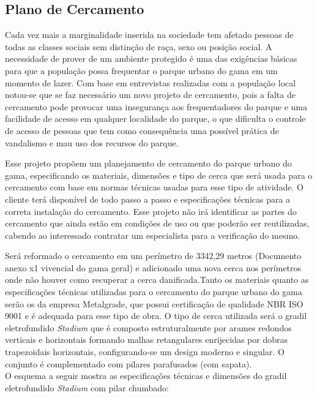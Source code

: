 \subsection{Plano de Cercamento}

Cada vez mais a marginalidade inserida na sociedade tem afetado pessoas de todas as classes sociais sem distin\c{c}\~ao de ra\c{c}a, sexo ou posi\c{c}\~ao social. A necessidade de prover de um ambiente protegido \'e uma das exig\^encias b\'asicas para que a popula\c{c}\~ao possa frequentar o parque urbano do gama em um momento de lazer. Com base em entrevistas realizadas com a popula\c{c}\~ao local notou-se que se faz necess\'ario um novo projeto de cercamento, pois a falta de cercamento pode provocar uma inseguran\c{c}a aos frequentadores do parque e uma facilidade de acesso em qualquer localidade do parque, o que dificulta o controle de acesso de pessoas que tem como consequ\^encia uma poss\'ivel pr\'atica de vandalismo e mau uso dos recursos do parque.

	Esse projeto prop\~oem um planejamento de cercamento do parque urbano do gama, especificando os materiais, dimens\~oes e tipo de cerca que ser\'a usada para o cercamento com base em normas t\'ecnicas usadas para esse tipo de atividade. O cliente ter\'a dispon\'ivel de todo passo a passo e especifica\c{c}\~oes t\'ecnicas para a correta instala\c{c}\~ao do cercamento. Esse projeto n\~ao ir\'a identificar as partes do cercamento que ainda est\~ao em condi\c{c}\~oes de uso ou que poder\~ao ser reutilizadas, cabendo ao interessado contratar um especialista para a verifica\c{c}\~ao do mesmo.
	
	Ser\'a reformado o cercamento em um per\'imetro de 3342,29 metros (Documento anexo x1 vivencial do gama geral) e adicionado uma nova cerca nos per\'imetros onde n\~ao houver como recuperar a cerca danificada.Tanto os materiais quanto as especifica\c{c}\~oes t\'ecnicas utilizadas para o cercamento do parque urbano do gama ser\~ao os da empresa Metalgrade, que possui certifica\c{c}\~ao de qualidade NBR ISO 9001 e \'e adequada para esse tipo de obra.  O tipo de cerca utilizada ser\'a o gradil eletrofundido \textit{Stadium} que \'e composto estruturalmente por arames redondos verticais e horizontais formando malhas retangulares enrijecidas por dobras trapezoidais horizontais, configurando-se um design moderno e singular. O conjunto \'e complementado com  pilares parafusados (com sapata). \cite{CatalogoCercamento} \\ O esquema a seguir mostra as especifica\c{c}\~oes t\'ecnicas e dimens\~oes do gradil eletrofundido \textit{Stadium} com pilar chumbado:

